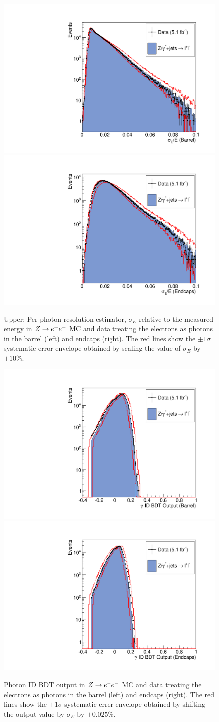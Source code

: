 \begin{figure}
\begin{center}
  \includegraphics[width=.48\textwidth]{hgg7TeV/zeeValidation/sigmaE_EB.pdf}
  \includegraphics[width=.48\textwidth]{hgg7TeV/zeeValidation/sigmaE_EE.pdf}
\label{fig:zeevalidsigmaE}
\caption{Upper: Per-photon resolution estimator, $\sigma_{E}$ relative to the measured energy in $Z\rightarrow e^{+}e^{-}$ 
MC and data 
treating the electrons as photons in the barrel (left) and endcaps (right). 
The red lines show the $\pm 1\sigma$ systematic error envelope obtained by scaling the value of 
$\sigma_{E}$ by $\pm 10\%$.}
\end{center}
\end{figure}

\begin{figure}
\begin{center}
  \includegraphics[width=.48\textwidth]{hgg7TeV/zeeValidation/phoID_EB.pdf}
  \includegraphics[width=.48\textwidth]{hgg7TeV/zeeValidation/phoID_EE.pdf}
\label{fig:zeevalidphoidmva}
\caption{Photon ID BDT output in $Z\rightarrow e^{+}e^{-}$ MC and data 
treating the electrons as photons in the barrel (left) and endcaps (right). 
The red lines show the $\pm 1\sigma$ systematic error envelope obtained by shifting the output value by $\sigma_{E}$ by $\pm 0.025\%$.}
\end{center}
\end{figure}


